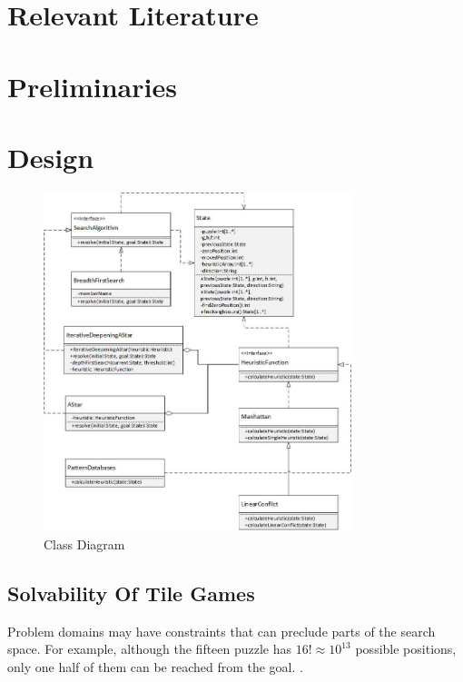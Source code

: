 \documentclass[final]{cmpreport}
\begin{document}
 
 

 


\section{Relevant Literature}


\section{Preliminaries}

\section{Design}

\begin{figure}[t]
	\centering
	\includegraphics[width=0.8\textwidth]{classDiagram}
	\captionsetup{justification=centering}
	\caption{Class Diagram}
\end{figure}


\subsection{Solvability Of Tile Games}
Problem domains may have constraints that can preclude parts of the search space. For example, although the fifteen puzzle has $ 16! \approx 10^{13} $ possible positions, only one half of them can be reached from the goal. \citep{DBLP:journals/ci/CulbersonS98}. 
\end{document}
